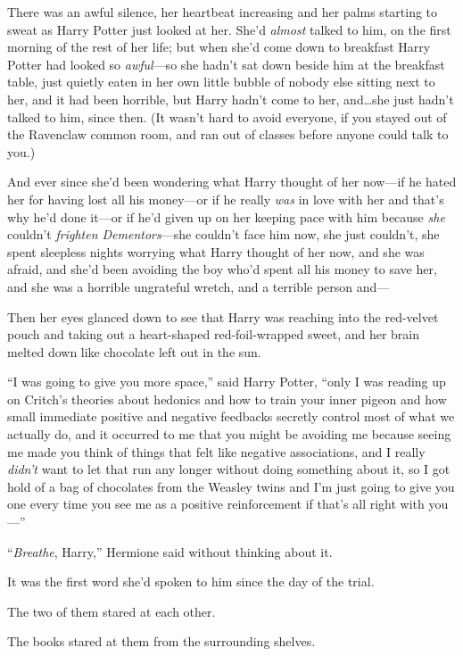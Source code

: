 There was an awful silence, her heartbeat increasing and her palms starting to sweat as Harry Potter just looked at her. She’d \emph{almost} talked to him, on the first morning of the rest of her life; but when she’d come down to breakfast Harry Potter had looked so \emph{awful}—so she hadn’t sat down beside him at the breakfast table, just quietly eaten in her own little bubble of nobody else sitting next to her, and it had been horrible, but Harry hadn’t come to her, and…she just hadn’t talked to him, since then. (It wasn’t hard to avoid everyone, if you stayed out of the Ravenclaw common room, and ran out of classes before anyone could talk to you.)

And ever since she’d been wondering what Harry thought of her now—if he hated her for having lost all his money—or if he really \emph{was} in love with her and that’s why he’d done it—or if he’d given up on her keeping pace with him because \emph{she} couldn’t \emph{frighten Dementors}—she couldn’t face him now, she just couldn’t, she spent sleepless nights worrying what Harry thought of her now, and she was afraid, and she’d been avoiding the boy who’d spent all his money to save her, and she was a horrible ungrateful wretch, and a terrible person and—

Then her eyes glanced down to see that Harry was reaching into the red-velvet pouch and taking out a heart-shaped red-foil-wrapped sweet, and her brain melted down like chocolate left out in the sun.

“I was going to give you more space,” said Harry Potter, “only I was reading up on Critch’s theories about hedonics and how to train your inner pigeon and how small immediate positive and negative feedbacks secretly control most of what we actually do, and it occurred to me that you might be avoiding me because seeing me made you think of things that felt like negative associations, and I really \emph{didn’t} want to let that run any longer without doing something about it, so I got hold of a bag of chocolates from the Weasley twins and I’m just going to give you one every time you see me as a positive reinforcement if that’s all right with you—”

“\emph{Breathe}, Harry,” Hermione said without thinking about it.

It was the first word she’d spoken to him since the day of the trial.

The two of them stared at each other.

The books stared at them from the surrounding shelves.

